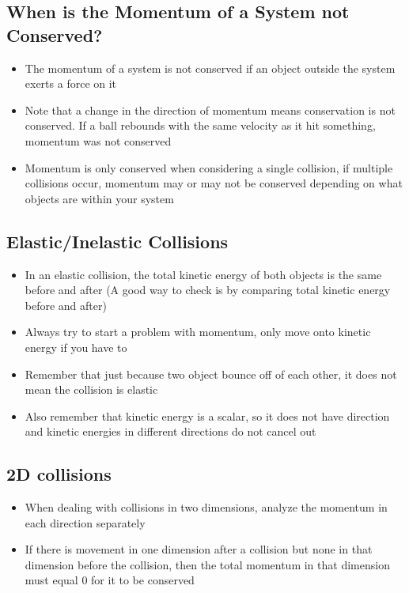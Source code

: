 \subsection{When is the Momentum of a System not Conserved?}
\begin{itemize}
    \item The momentum of a system is not conserved if an object outside the system exerts a force on it
    \item Note that a change in the direction of momentum means conservation is not conserved. If a ball rebounds with the same velocity as it hit something, momentum was not conserved
    \item Momentum is only conserved when considering a single collision, if multiple collisions occur, momentum may or may not be conserved depending on what objects are within your system
\end{itemize}

\subsection{Elastic/Inelastic Collisions}
\begin{itemize}
    \item In an elastic collision, the total kinetic energy of both objects is the same before and after (A good way to check is by comparing total kinetic energy before and after)
    \item Always try to start a problem with momentum, only move onto kinetic energy if you have to
    \item Remember that just because two object bounce off of each other, it does not mean the collision is elastic
    \item Also remember that kinetic energy is a scalar, so it does not have direction and kinetic energies in different directions do not cancel out
\end{itemize}

\subsection{2D collisions}
\begin{itemize}
    \item When dealing with collisions in two dimensions, analyze the momentum in each direction separately
    \item If there is movement in one dimension after a collision but none in that dimension before the collision, then the total momentum in that dimension must equal 0 for it to be conserved
\end{itemize}

